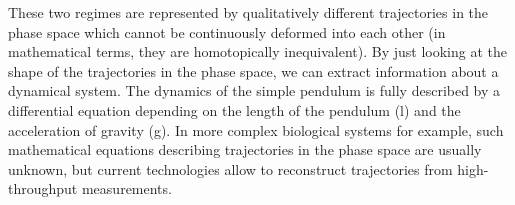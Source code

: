 These two regimes are represented by qualitatively different trajectories in the phase space which cannot be continuously deformed into each other (in mathematical terms, they are homotopically inequivalent). By just looking at the shape of the trajectories in the phase space, we can extract information about a dynamical system. The dynamics of the simple pendulum is fully described by a differential equation depending on the length of the pendulum (l) and the acceleration of gravity (g). In more complex biological systems for example, such mathematical equations describing trajectories in the phase space are usually unknown, but current technologies allow to reconstruct trajectories from high-throughput measurements.



